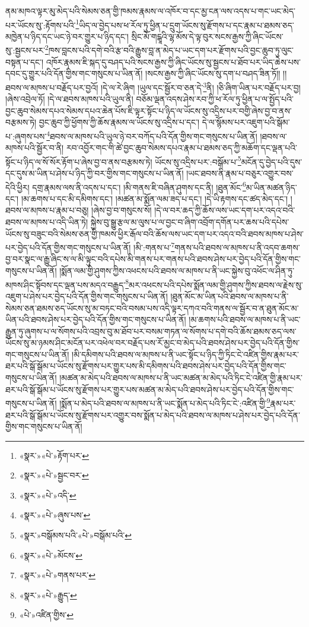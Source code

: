 ནམ་མཁའ་ལྟར་མུ་མེད་པའི་སེམས་ཅན་གྱི་ཁམས་རྣམས་ལ་འཁོར་བ་དང་མྱ་ངན་ལས་འདས་པ་གང་ཡང་མེད་པར་ཡོངས་སུ་:རྟོགས་པའི་\footnote{«སྣར་»«པེ་»རྟོག་པར་}ཡིད་ལ་བྱེད་པས་ཕ་རོལ་ཏུ་ཕྱིན་པ་དྲུག་ཡོངས་སུ་རྫོགས་པ་དང་རྣམ་པ་ཐམས་ཅད་མཁྱེན་པ་ཉིད་དང་ཡང་ཉེ་བར་གྱུར་པ་ཉིད་དང་། སྲིང་མོ་གངྒཱའི་ལྷ་མོས་དེ་ལྟ་བུར་སངས་རྒྱས་ཀྱི་ཞིང་ཡོངས་སུ་:སྦྱངས་པར་\footnote{«སྣར་»«པེ་»སྦྱང་བར་}ཁས་བླངས་པའི་དགེ་བའི་རྩ་བའི་རྒྱུས་བླ་ན་མེད་པ་ཡང་དག་པར་རྫོགས་པའི་བྱང་ཆུབ་ཏུ་ལུང་བསྟན་པ་དང་། འཁོར་རྣམས་ཇི་སྐད་དུ་བཤད་པའི་སངས་རྒྱས་ཀྱི་ཞིང་ཡོངས་སུ་སྦྱངས་པ་ཐོབ་པར་ཡིད་ཆེས་པས་དབང་དུ་གྱུར་པའི་དོན་གྱིས་གང་གསུངས་པ་ཡིན་ནོ། །སངས་རྒྱས་ཀྱི་ཞིང་ཡོངས་སུ་དག་པ་བཤད་ཟིན་ཏོ།། །།ཐབས་ལ་མཁས་པ་བརྗོད་པར་བྱའོ། །དེ་ལ་རེ་ཞིག །ཡུལ་དང་སྦྱོར་བ་ཅན་དེ་\footnote{«སྣར་»«པེ་»འདི་}ནི། །ཅི་ཞིག་ཡིན་པར་བརྗོད་པར་བྱ། །ཞེས་འབྲེལ་ཏོ། །དེ་ལ་ཐབས་མཁས་པའི་ཡུལ་ནི། བཅོམ་ལྡན་འདས་ཤེས་རབ་ཀྱི་ཕ་རོལ་ཏུ་ཕྱིན་པ་ལ་སྤྱོད་པའི་བྱང་ཆུབ་སེམས་དཔའ་སེམས་དཔའ་ཆེན་པོས་ཇི་ལྟར་སྟོང་པ་ཉིད་ལ་ཡོངས་སུ་འདྲིས་པར་བགྱི་ཞེས་བྱ་བ་ནས་བརྩམས་ཏེ། བྱང་ཆུབ་ཀྱི་ཕྱོགས་ཀྱི་ཆོས་རྣམས་ལ་ཡོངས་སུ་འདྲིས་པ་དང་། དེ་ལ་སྙོམས་པར་འཇུག་པའི་སྒོམ་པ་:ཞུགས་པས་\footnote{«སྣར་»«པེ་»ཞུས་པས་}ཐབས་ལ་མཁས་པའི་ཡུལ་ཉེ་བར་བཀོད་པའི་དོན་གྱིས་གང་གསུངས་པ་ཡིན་ནོ། །ཐབས་ལ་མཁས་པའི་སྦྱོར་བ་ནི། རབ་འབྱོར་གང་གི་ཚེ་བྱང་ཆུབ་སེམས་དཔའ་རྣམ་པ་ཐམས་ཅད་ཀྱི་མཆོག་དང་ལྡན་པའི་སྟོང་པ་ཉིད་ལ་སོ་སོར་རྟོག་པ་ཞེས་བྱ་བ་ནས་བརྩམས་ཏེ། ཡོངས་སུ་འདྲིས་པར་:བསྒོམ་པ་\footnote{«སྣར་»བསྒོམས་པའི་«པེ་»བསྒོམ་པའི་}མངོན་དུ་བྱེད་པའི་དུས་དང་དུས་མ་ཡིན་པ་ཤེས་པ་ཉིད་ཀྱི་བར་གྱིས་གང་གསུངས་པ་ཡིན་ནོ། །ཡང་ཐབས་ནི་རྣམ་པ་བཅུར་འགྱུར་བས་དེའི་ཕྱིར། དགྲ་རྣམས་ལས་ནི་འདས་པ་དང་། །མི་གནས་ཇི་བཞིན་ཤུགས་དང་ནི། །ཐུན་མོང་\footnote{«སྣར་»«པེ་»མོངས་}མ་ཡིན་མཚན་ཉིད་དང་། །མ་ཆགས་པ་དང་མི་དམིགས་དང་། །མཚན་མ་སྨོན་ལམ་ཟད་པ་དང་། །དེ་ཡི་རྟགས་དང་ཚད་མེད་དང་། །ཐབས་ལ་མཁས་པ་རྣམ་པ་བཅུ། །ཞེས་བྱ་བ་གསུངས་སོ། །དེ་ལ་བར་ཆད་ཀྱི་ཆོས་ལས་ཡང་དག་པར་འདའ་བའི་ཐབས་ལ་མཁས་པ་འདི་ཡིན་ཏེ། སྐྱེས་བུ་སྒྱུ་རྩལ་མ་ལུས་པ་ལ་བྱང་བ་ཞིག་འབྲོག་དགོན་པར་ཆས་པའི་དཔེས་ཡོངས་སུ་བཟུང་བའི་སེམས་ཅན་གྱི་ཁམས་ཕྱིར་རྒོལ་བའི་ཆོས་ལས་ཡང་དག་པར་འདའ་བའི་ཐབས་མཁས་པ་ཤེས་པར་བྱེད་པའི་དོན་གྱིས་གང་གསུངས་པ་ཡིན་ནོ། །མི་:གནས་པ་\footnote{«སྣར་»«པེ་»གནས་པར་}གནས་པའི་ཐབས་ལ་མཁས་པ་ནི་འདབ་ཆགས་བྱ་བར་སྣང་ལ་རྒྱུ་ཞིང་ས་ལ་མི་ལྟུང་བའི་དཔེས་མི་གནས་པར་གནས་པའི་ཐབས་ཤེས་པར་བྱེད་པའི་དོན་གྱིས་གང་གསུངས་པ་ཡིན་ནོ། །སྨོན་ལམ་གྱི་ཤུགས་ཀྱིས་འཕངས་པའི་ཐབས་ལ་མཁས་པ་ནི་ཡང་སྐྱེས་བུ་འཕོང་ལ་ཤིན་ཏུ་མཁས་ཤིང་སྟོབས་དང་ལྡན་པས་མདའ་བརྒྱུད་\footnote{«སྣར་»«པེ་»རྒྱུད་}མར་འཕངས་པའི་དཔེས་སྨོན་ལམ་གྱི་ཤུགས་ཀྱིས་ཐབས་ལ་རྗེས་སུ་འཇུག་པ་ཤེས་པར་བྱེད་པའི་དོན་གྱིས་གང་གསུངས་པ་ཡིན་ནོ། །ཐུན་མོང་མ་ཡིན་པའི་ཐབས་ལ་མཁས་པ་ནི་སེམས་ཅན་ཐམས་ཅད་ཡོངས་སུ་མ་བཏང་བའི་བསམ་པས་འདི་ལྟར་དཀའ་བའི་གནས་ལ་སྦྱོར་བ་ན་ཐུན་མོང་མ་ཡིན་པའི་ཐབས་ཤེས་པར་བྱེད་པའི་དོན་གྱིས་གང་གསུངས་པ་ཡིན་ནོ། །མ་ཆགས་པའི་ཐབས་ལ་མཁས་པ་ནི་ཡང་རྒྱུན་ཏུ་ཞུགས་པ་ལ་སོགས་པའི་འབྲས་བུ་མ་ཐོབ་པར་བསམ་གཏན་ལ་སོགས་པ་དགེ་བའི་ཆོས་ཐམས་ཅད་ལས་ཡོངས་སུ་མ་ཉམས་ཤིང་མངོན་པར་འཕེལ་བར་བརྗོད་པས་རོ་མྱང་བ་མེད་པའི་ཐབས་ཤེས་པར་བྱེད་པའི་དོན་གྱིས་གང་གསུངས་པ་ཡིན་ནོ། །མི་དམིགས་པའི་ཐབས་ལ་མཁས་པ་ནི་ཡང་སྟོང་པ་ཉིད་ཀྱི་ཏིང་ངེ་འཛིན་གྱིས་རྣམ་པར་ཐར་པའི་སྒོ་སྒོམ་པ་ཡོངས་སུ་རྫོགས་པར་གྱུར་པས་མི་དམིགས་པའི་ཐབས་ཤེས་པར་བྱེད་པའི་དོན་གྱིས་གང་གསུངས་པ་ཡིན་ནོ། །མཚན་མ་མེད་པའི་ཐབས་ལ་མཁས་པ་ནི་ཡང་མཚན་མ་མེད་པའི་ཏིང་ངེ་འཛིན་གྱི་རྣམ་པར་ཐར་པའི་སྒོ་སྒོམ་པ་ཡོངས་སུ་རྫོགས་པར་གྱུར་པས་མཚན་མ་མེད་པའི་ཐབས་ཤེས་པར་བྱེད་པའི་དོན་གྱིས་གང་གསུངས་པ་ཡིན་ནོ། །སྨོན་པ་མེད་པའི་ཐབས་ལ་མཁས་པ་ནི་ཡང་སྨོན་པ་མེད་པའི་ཏིང་ངེ་:འཛིན་གྱི་\footnote{«པེ་»འཛིན་གྱིས་}རྣམ་པར་ཐར་པའི་སྒོ་སྒོམ་པ་ཡོངས་སུ་རྫོགས་པར་འགྱུར་བས་སྨོན་པ་མེད་པའི་ཐབས་ལ་མཁས་པ་ཤེས་པར་བྱེད་པའི་དོན་གྱིས་གང་གསུངས་པ་ཡིན་ནོ། 